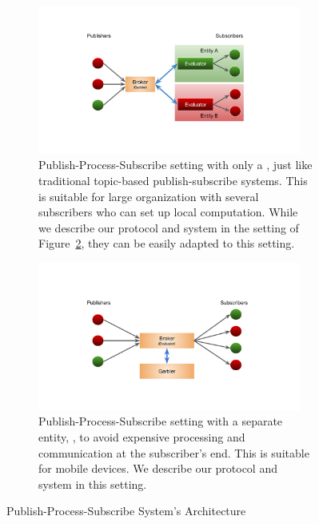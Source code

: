 \begin{figure}[h]
	\centering

	\begin{subfigure}{0.45\textwidth}
		\centering
		\includegraphics[width=0.95\textwidth]{figures/pps-local}
		\caption{Publish-Process-Subscribe setting with only a \broker, just like traditional topic-based publish-subscribe systems. This is suitable for large organization with several subscribers who can set up local computation. While we describe our protocol and system in the setting of Figure~\ref{fig:pps-out}, they can be easily adapted to this setting.}
		\label{fig:pps-local}
	\end{subfigure}

	\begin{subfigure}{0.45\textwidth}
		\centering
		\includegraphics[width=0.95\textwidth]{figures/pps-out}
		\caption{Publish-Process-Subscribe setting with a separate entity, \garbler, to avoid expensive processing and communication at the subscriber's end. This is suitable for mobile devices. We describe our protocol and system in this setting.}
		\label{fig:pps-out}
	\end{subfigure}
	\vspace{12pt}
	\caption{Publish-Process-Subscribe System's Architecture}
	\label{fig:pps}
\end{figure}

